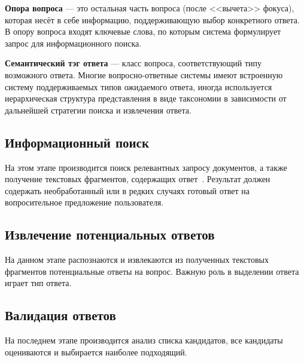 \textbf{Опора вопроса} --- это остальная часть вопроса (после <<вычета>> фокуса), которая несёт в себе информацию, поддерживающую выбор конкретного ответа. В опору вопроса входят ключевые слова, по которым система формулирует запрос для информационного поиска.

\textbf{Семантический тэг ответа} --- класс вопроса, соответствующий типу возможного ответа. Многие вопросно-ответные системы имеют встроенную систему поддерживаемых типов ожидаемого ответа, иногда используется иерархическая структура представления в виде таксономии в зависимости от дальнейшей стратегии поиска и извлечения ответа.

\subsection{Информационный поиск}

На этом этапе производится поиск релевантных запросу документов, а также получение текстовых фрагментов, содержащих ответ~\cite{step21}. Результат должен содержать необработанный или в редких случаях готовый ответ на вопросительное предложение пользователя.

\subsection{Извлечение потенциальных ответов}

На данном этапе распознаются и извлекаются из полученных текстовых фрагментов потенциальные ответы на вопрос. Важную роль в выделении ответа играет тип ответа. 

\subsection{Валидация ответов}

На последнем этапе производится анализ списка кандидатов, все кандидаты оцениваются и выбирается наиболее подходящий.
